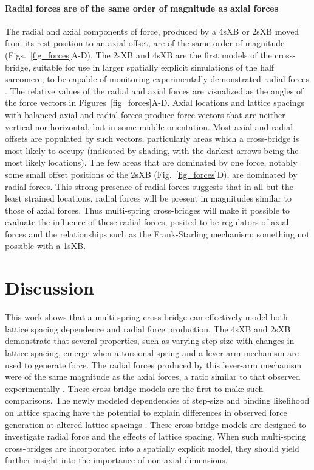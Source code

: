 \documentclass[]{article}
\begin{document}
\paragraph{Radial forces are of the same order of magnitude as axial forces} %
The radial and axial components of force, produced by a 4sXB or 2sXB moved from its rest position to an axial offset, are of the same order of magnitude (Figs.~\ref{fig_forces}A-D). 
The 2sXB and 4sXB are the first models of the cross-bridge, suitable for use in larger spatially explicit simulations of the half sarcomere, to be capable of monitoring experimentally demonstrated radial forces \citep{Cecchi1990, Millman1998}. 
The relative values of the radial and axial forces are visualized as the angles of the force vectors in Figures~\ref{fig_forces}A-D. 
Axial locations and lattice spacings with balanced axial and radial forces produce force vectors that are neither vertical nor horizontal, but in some middle orientation.
Most axial and radial offsets are populated by such vectors, particularly areas which a cross-bridge is most likely to occupy (indicated by shading, with the darkest arrows being the most likely locations). 
The few areas that are dominated by one force, notably some small offset positions of the 2sXB (Fig.~\ref{fig_forces}D), are dominated by radial forces.
This strong presence of radial forces suggests that in all but the least strained locations, radial forces will be present in magnitudes similar to those of axial forces. 
Thus multi-spring cross-bridges will make it possible to evaluate the influence of these radial forces, posited to be regulators of axial forces and the relationships such as the Frank-Starling mechanism; something not possible with a 1sXB\@. 



\section{Discussion} %

This work shows that a multi-spring cross-bridge can effectively model both lattice spacing dependence and radial force production. 
The 4sXB and 2sXB demonstrate that several properties, such as varying step size with changes in lattice spacing, emerge when a torsional spring and a lever-arm mechanism are used to generate force. 
The radial forces produced by this lever-arm mechanism were of the same magnitude as the axial forces, a ratio similar to that observed experimentally \citep{Cecchi1990,Brenner1991}. 
These cross-bridge models are the first to make such comparisons.
The newly modeled dependencies of step-size and binding likelihood on lattice spacing have the potential to explain differences in observed force generation at altered lattice spacings  \citep{Millman1998}. 
These cross-bridge models are designed to investigate radial force and the effects of lattice spacing. 
When such multi-spring cross-bridges are incorporated into a spatially explicit model, they should yield further insight into the importance of non-axial dimensions. 
\end{document}
